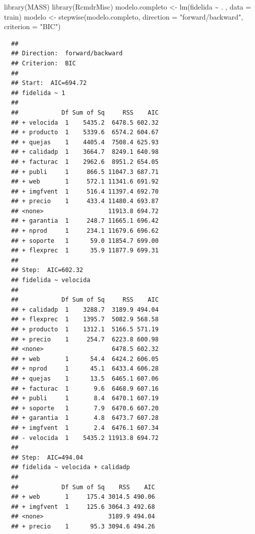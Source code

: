 \documentclass[
]{book}
\newenvironment{Shaded}{\begin{snugshade}}{\end{snugshade}}
\newcommand{\AttributeTok}[1]{\textcolor[rgb]{0.77,0.63,0.00}{#1}}
\newcommand{\FunctionTok}[1]{\textcolor[rgb]{0.00,0.00,0.00}{#1}}
\newcommand{\NormalTok}[1]{#1}
\newcommand{\OtherTok}[1]{\textcolor[rgb]{0.56,0.35,0.01}{#1}}
\newcommand{\SpecialCharTok}[1]{\textcolor[rgb]{0.00,0.00,0.00}{#1}}
\newcommand{\StringTok}[1]{\textcolor[rgb]{0.31,0.60,0.02}{#1}}
\theoremstyle{break}
\theoremstyle{nonumberplain}
\begin{document}
\begin{Shaded}
\begin{Highlighting}[]
\FunctionTok{library}\NormalTok{(MASS)}
\FunctionTok{library}\NormalTok{(RcmdrMisc)}
\NormalTok{modelo.completo }\OtherTok{\textless{}{-}} \FunctionTok{lm}\NormalTok{(fidelida }\SpecialCharTok{\textasciitilde{}}\NormalTok{ . , }\AttributeTok{data =}\NormalTok{ train)}
\NormalTok{modelo }\OtherTok{\textless{}{-}} \FunctionTok{stepwise}\NormalTok{(modelo.completo, }\AttributeTok{direction =} \StringTok{"forward/backward"}\NormalTok{, }\AttributeTok{criterion =} \StringTok{"BIC"}\NormalTok{)}
\end{Highlighting}
\end{Shaded}

\begin{verbatim}
  ## 
  ## Direction:  forward/backward
  ## Criterion:  BIC 
  ## 
  ## Start:  AIC=694.72
  ## fidelida ~ 1
  ## 
  ##            Df Sum of Sq     RSS    AIC
  ## + velocida  1    5435.2  6478.5 602.32
  ## + producto  1    5339.6  6574.2 604.67
  ## + quejas    1    4405.4  7508.4 625.93
  ## + calidadp  1    3664.7  8249.1 640.98
  ## + facturac  1    2962.6  8951.2 654.05
  ## + publi     1     866.5 11047.3 687.71
  ## + web       1     572.1 11341.6 691.92
  ## + imgfvent  1     516.4 11397.4 692.70
  ## + precio    1     433.4 11480.4 693.87
  ## <none>                  11913.8 694.72
  ## + garantia  1     248.7 11665.1 696.42
  ## + nprod     1     234.1 11679.6 696.62
  ## + soporte   1      59.0 11854.7 699.00
  ## + flexprec  1      35.9 11877.9 699.31
  ## 
  ## Step:  AIC=602.32
  ## fidelida ~ velocida
  ## 
  ##            Df Sum of Sq     RSS    AIC
  ## + calidadp  1    3288.7  3189.9 494.04
  ## + flexprec  1    1395.7  5082.9 568.58
  ## + producto  1    1312.1  5166.5 571.19
  ## + precio    1     254.7  6223.8 600.98
  ## <none>                   6478.5 602.32
  ## + web       1      54.4  6424.2 606.05
  ## + nprod     1      45.1  6433.4 606.28
  ## + quejas    1      13.5  6465.1 607.06
  ## + facturac  1       9.6  6468.9 607.16
  ## + publi     1       8.4  6470.1 607.19
  ## + soporte   1       7.9  6470.6 607.20
  ## + garantia  1       4.8  6473.7 607.28
  ## + imgfvent  1       2.4  6476.1 607.34
  ## - velocida  1    5435.2 11913.8 694.72
  ## 
  ## Step:  AIC=494.04
  ## fidelida ~ velocida + calidadp
  ## 
  ##            Df Sum of Sq    RSS    AIC
  ## + web       1     175.4 3014.5 490.06
  ## + imgfvent  1     125.6 3064.3 492.68
  ## <none>                  3189.9 494.04
  ## + precio    1      95.3 3094.6 494.26

\end{verbatim}
\end{document}
